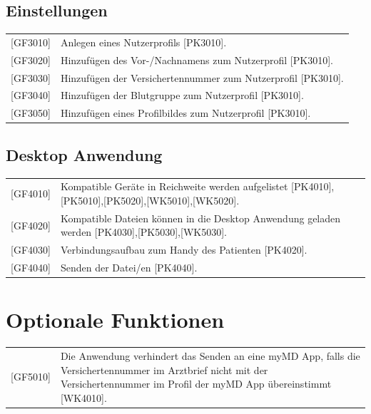 \documentclass[a4paper]{scrreprt}
\begin{document}
\subsection{Einstellungen}
\begin{tabular}{lll}
[GF3010]&  \multicolumn{2}{p{12cm}}{Anlegen eines Nutzerprofils [PK3010].}\\
{[GF3020]} &  \multicolumn{2}{p{12cm}}{Hinzufügen des Vor-/Nachnamens zum Nutzerprofil [PK3010].}  \\
{[GF3030]} &  \multicolumn{2}{p{12cm}}{Hinzufügen der Versichertennummer zum Nutzerprofil [PK3010].}  \\
{[GF3040]} &  \multicolumn{2}{p{12cm}}{Hinzufügen der Blutgruppe zum Nutzerprofil [PK3010].}  \\
{[GF3050]} &  \multicolumn{2}{p{12cm}}{Hinzufügen eines Profilbildes zum Nutzerprofil [PK3010].}  \\
\end{tabular}

\subsection{\gls{Desktop Anwendung}}
\begin{tabular}{lll}
[GF4010]&  \multicolumn{2}{p{12cm}}{Kompatible Geräte in Reichweite werden aufgelistet [PK4010],[PK5010],[PK5020],[WK5010],[WK5020].}\\
{[GF4020]} &  \multicolumn{2}{p{12cm}}{Kompatible Dateien können in die Desktop Anwendung geladen werden [PK4030],[PK5030],[WK5030].}  \\
{[GF4030]} &  \multicolumn{2}{p{12cm}}{Verbindungsaufbau zum Handy des Patienten [PK4020].}  \\
{[GF4040]} &  \multicolumn{2}{p{12cm}}{Senden der Datei/en [PK4040].}  \\
\end{tabular}

\section{Optionale Funktionen}
\begin{tabular}{lll}
[GF5010]&  \multicolumn{2}{p{12cm}}{Die Anwendung verhindert das Senden an eine myMD \gls{App}, falls die Versichertennummer im Arztbrief nicht mit der Versichertennummer im Profil der myMD App übereinstimmt [WK4010].}\\
\end{tabular}
\end{document}
